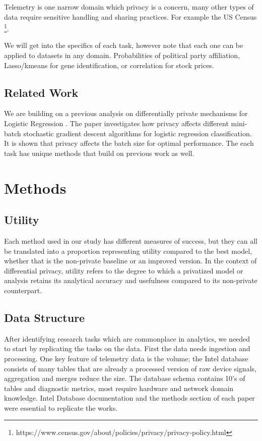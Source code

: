 \documentclass[12pt,letterpaper]{article}
\begin{document}
Telemetry is one narrow domain which privacy is a concern, many other types of data require sensitive handling and sharing practices. For example the US Census \footnote{https://www.census.gov/about/policies/privacy/privacy-policy.html}. 

We will get into the specifics of each task, however note that each one can be applied to datasets in any domain. Probabilities of political party affiliation, Lasso/kmeans for gene identification, or correlation for stock prices. 

\subsection{Related Work}

We are building on a previous analysis on differentially private mechanisms for Logistic Regression \cite{qtr1proj}. The paper investigates how privacy affects different mini-batch stochastic gradient descent algorithms for logistic regression classification. It is shown that privacy affects the batch size for optimal performance. The each task has unique methods that build on previous work as well. 


\section{Methods}

\subsection{Utility}

Each method used in our study has different measures of success, but they can all be translated into a proportion representing utility compared to the best model, whether that is the non-private baseline or an improved version. In the context of differential privacy, utility refers to the degree to which a privatized model or analysis retains its analytical accuracy and usefulness compared to its non-private counterpart.


\subsection{Data Structure}

After identifying research tasks which are commonplace in analytics, we needed to start by replicating the tasks on the data. First the data needs ingestion and processing. One key feature of telemetry data is the volume; the Intel database consists of many tables that are already a processed version of raw device signals, aggregation and merges reduce the size. The database schema contains 10's of tables and diagnostic metrics, most require hardware and network domain knowledge. Intel Database documentation and the methods section of each paper were essential to replicate the works.
\end{document}
